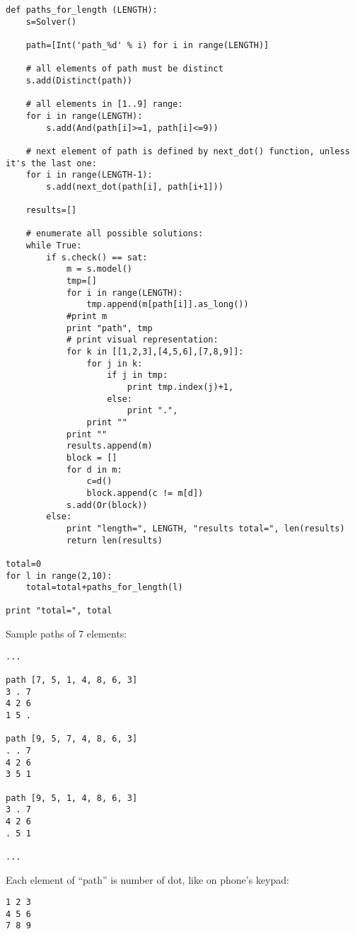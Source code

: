 \begin{lstlisting}[style=custompy]
def paths_for_length (LENGTH):
    s=Solver()

    path=[Int('path_%d' % i) for i in range(LENGTH)]

    # all elements of path must be distinct
    s.add(Distinct(path))

    # all elements in [1..9] range:
    for i in range(LENGTH):
        s.add(And(path[i]>=1, path[i]<=9))

    # next element of path is defined by next_dot() function, unless it's the last one:
    for i in range(LENGTH-1):
        s.add(next_dot(path[i], path[i+1]))

    results=[]

    # enumerate all possible solutions:
    while True:
        if s.check() == sat:
            m = s.model()
            tmp=[]
            for i in range(LENGTH):
                tmp.append(m[path[i]].as_long())
            #print m
            print "path", tmp
            # print visual representation:
            for k in [[1,2,3],[4,5,6],[7,8,9]]:
                for j in k:
                    if j in tmp:
                        print tmp.index(j)+1,
                    else:
                        print ".",
                print ""
            print ""
            results.append(m)
            block = []
            for d in m:
                c=d()
                block.append(c != m[d])
            s.add(Or(block))
        else:
            print "length=", LENGTH, "results total=", len(results)
            return len(results)

total=0
for l in range(2,10):
    total=total+paths_for_length(l)

print "total=", total
\end{lstlisting}

Sample paths of 7 elements:

\begin{lstlisting}
...

path [7, 5, 1, 4, 8, 6, 3]
3 . 7
4 2 6
1 5 .

path [9, 5, 7, 4, 8, 6, 3]
. . 7
4 2 6
3 5 1

path [9, 5, 1, 4, 8, 6, 3]
3 . 7
4 2 6
. 5 1

...
\end{lstlisting}

Each element of ``path'' is number of dot, like on phone's keypad:

\begin{lstlisting}
1 2 3
4 5 6
7 8 9
\end{lstlisting}

